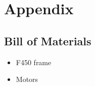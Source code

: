 



\section{Appendix}

\subsection{Bill of Materials}

\begin{itemize}
	\item F450 frame
	\item Motors
\end{itemize}

\newpage

%


